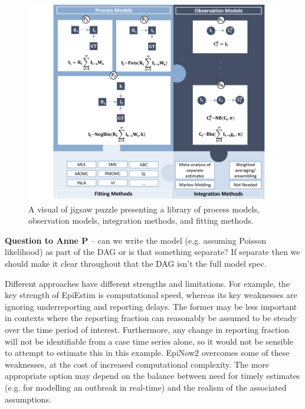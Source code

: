 \documentclass{article}
\begin{document}


\begin{figure}[htbp]
    \centering
    \includegraphics[width=\textwidth]{figures/Case study puzzle.png}
    \caption{A visual of jigsaw puzzle presenting a library of process models, observation models, integration methods, and fitting methods.}
    \label{fig:case_study_visual}
\end{figure}

\textbf{Question to Anne P} – can we write the model (e.g. assuming Poisson likelihood) as part of the DAG or is that something separate? If separate then we should make it clear throughout that the DAG isn’t the full model spec.

Different approaches have different strengths and limitations. For example, the key strength of EpiEstim is computational speed, whereas its key weaknesses are ignoring underreporting and reporting delays. The former may be less important in contexts where the reporting fraction can reasonably be assumed to be steady over the time period of interest. Furthermore, any change in reporting fraction will not be identifiable from a case time series alone, so it would not be sensible to attempt to estimate this in this example. EpiNow2 overcomes some of these weaknesses, at the cost of increased computational complexity. The more appropriate option may depend on the balance between need for timely estimates (e.g. for modelling an outbreak in real-time) and the realism of the associated assumptions. 
\end{document}
